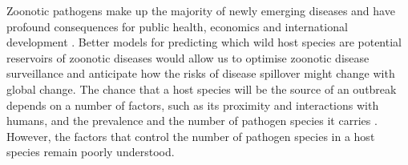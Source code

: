 

Zoonotic pathogens make up the majority of newly emerging diseases and have profound consequences for public health, economics and international development \cite{jones2008global, smith2014global, ebolaWorldbank}.
Better models for predicting which wild host species are potential reservoirs of zoonotic diseases would allow us to optimise zoonotic disease surveillance and anticipate how the risks of disease spillover might change with global change.
The chance that a host species will be the source of an outbreak depends on a number of factors, such as its proximity and interactions with humans, and the prevalence and the number of pathogen species it carries \cite{wolfe2000deforestation}.
However, the factors that control the number of pathogen species in a host species remain poorly understood.



